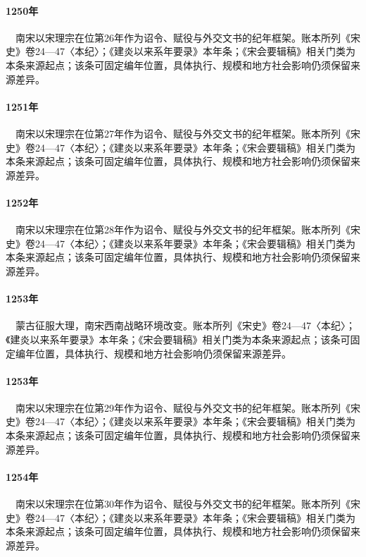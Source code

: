 \paragraph{1250年}　南宋以宋理宗在位第26年作为诏令、赋役与外交文书的纪年框架。账本所列《宋史》卷24—47〈本纪〉；《建炎以来系年要录》本年条；《宋会要辑稿》相关门类为本条来源起点；该条可固定编年位置，具体执行、规模和地方社会影响仍须保留来源差异。

\paragraph{1251年}　南宋以宋理宗在位第27年作为诏令、赋役与外交文书的纪年框架。账本所列《宋史》卷24—47〈本纪〉；《建炎以来系年要录》本年条；《宋会要辑稿》相关门类为本条来源起点；该条可固定编年位置，具体执行、规模和地方社会影响仍须保留来源差异。

\paragraph{1252年}　南宋以宋理宗在位第28年作为诏令、赋役与外交文书的纪年框架。账本所列《宋史》卷24—47〈本纪〉；《建炎以来系年要录》本年条；《宋会要辑稿》相关门类为本条来源起点；该条可固定编年位置，具体执行、规模和地方社会影响仍须保留来源差异。

\paragraph{1253年}　蒙古征服大理，南宋西南战略环境改变。账本所列《宋史》卷24—47〈本纪〉；《建炎以来系年要录》本年条；《宋会要辑稿》相关门类为本条来源起点；该条可固定编年位置，具体执行、规模和地方社会影响仍须保留来源差异。

\paragraph{1253年}　南宋以宋理宗在位第29年作为诏令、赋役与外交文书的纪年框架。账本所列《宋史》卷24—47〈本纪〉；《建炎以来系年要录》本年条；《宋会要辑稿》相关门类为本条来源起点；该条可固定编年位置，具体执行、规模和地方社会影响仍须保留来源差异。

\paragraph{1254年}　南宋以宋理宗在位第30年作为诏令、赋役与外交文书的纪年框架。账本所列《宋史》卷24—47〈本纪〉；《建炎以来系年要录》本年条；《宋会要辑稿》相关门类为本条来源起点；该条可固定编年位置，具体执行、规模和地方社会影响仍须保留来源差异。

